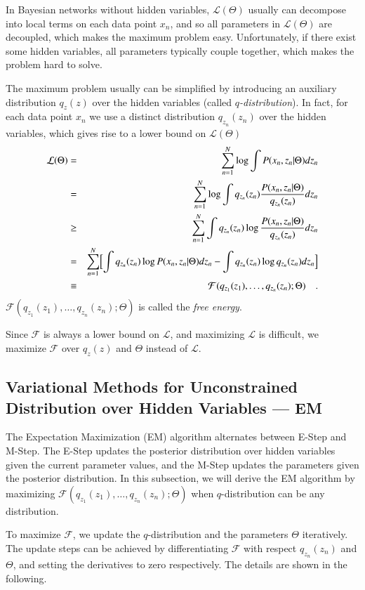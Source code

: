\documentclass{article}
\begin{document}
In Bayesian networks without hidden variables, $\mathcal{L}(\Theta)$ usually can
decompose into local terms on each data point $x_n$, and so all parameters in $\mathcal{L}(\Theta)$
are decoupled, which makes the maximum problem easy.
Unfortunately, if there exist some hidden variables, all parameters typically
couple together, which makes the problem hard to solve.

The maximum problem usually can be simplified by introducing an auxiliary distribution $q_z(z)$ over
the hidden variables (called \textit{$q$-distribution}).
In fact, for each data point $x_n$ we use a distinct distribution
$q_{z_n}(z_n)$ over the hidden variables, which gives rise to a lower bound on $\mathcal{L}(\Theta)$
\begin{eqnarray}
\mathcal{L}(\Theta) &=& \sum^N_{n=1} \log\int P(x_n,z_n|\Theta) dz_n \\
&=& \sum^N_{n=1} \log\int q_{z_n}(z_n) \frac{P(x_n,z_n|\Theta)}{q_{z_n}(z_n)}dz_n \\
&\geq& \sum^N_{n=1} \int q_{z_n}(z_n) \log\frac{P(x_n,z_n|\Theta)}{q_{z_n}(z_n)}dz_n \label{lf}\\
&=& \sum^N_{n=1}\Bigl[ \int q_{z_n}(z_n)\log P(x_n,z_n|\Theta)dz_n-
\int q_{z_n}(z_n)\log q_{z_n}(z_n)dz_n \Bigr]\label{freeenergy}\\
&\equiv& \mathcal{F}(q_{z_1}(z_1),\ldots,q_{z_n}(z_n);\Theta) \quad .
\end{eqnarray}
$\mathcal{F}(q_{z_1}(z_1),\ldots,q_{z_n}(z_n);\Theta)$ is called the \textit{free energy}.

Since $\mathcal{F}$ is always a lower bound on $\mathcal{L}$, and maximizing $\mathcal{L}$
is difficult, we maximize $\mathcal{F}$ over $q_z(z)$ and $\Theta$ instead of $\mathcal{L}$.

\subsection{Variational Methods for Unconstrained Distribution over Hidden Variables --- EM}
The Expectation Maximization (EM) algorithm alternates between E-Step and
M-Step.  The E-Step updates the posterior distribution over hidden variables given the current parameter values,
and the M-Step updates the parameters given the posterior distribution.
In this subsection, we will derive the EM algorithm by maximizing
$\mathcal{F}(q_{z_1}(z_1),\ldots,q_{z_n}(z_n);\Theta)$
when $q$-distribution can be any distribution.

To maximize $\mathcal{F}$, we update the $q$-distribution and the parameters $\Theta$
iteratively.  The update steps can be achieved by differentiating $\mathcal{F}$
with respect $q_{z_n}(z_n)$ and $\Theta$, and setting the derivatives to zero respectively.
The details are shown in the following.
\end{document}
